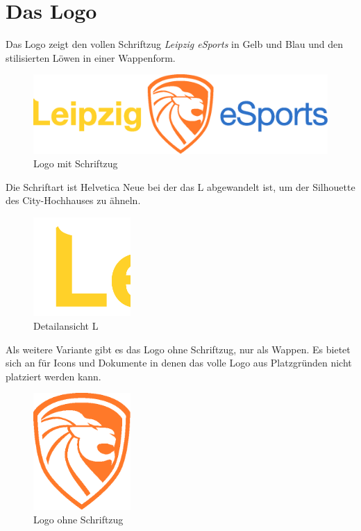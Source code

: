 \documentclass{article}
\begin{document}
\cleardoublepage
\section{Das Logo}

Das Logo zeigt den vollen Schriftzug \emph{Leipzig eSports} in Gelb und Blau und den stilisierten Löwen in einer Wappenform.
\begin{figure}[H]
\includegraphics[width=\textwidth]{Docs/Logo.eps}
\caption{Logo mit Schriftzug}
\end{figure}

Die Schriftart ist Helvetica Neue bei der das L abgewandelt ist, um der Silhouette des City-Hochhauses zu ähneln.

\begin{figure}[H]
\centering
\includegraphics[width=0.33\textwidth]{Docs/logo_detail_L.png}
\caption{Detailansicht L}
\end{figure}


Als weitere Variante gibt es das Logo ohne Schriftzug, nur als Wappen.
Es bietet sich an für Icons und Dokumente in denen das volle Logo aus Platzgründen nicht platziert werden kann.

\begin{figure}[H]
\centering
\includegraphics[width=0.33\textwidth]{Docs/Emblem.eps}
\caption{Logo ohne Schriftzug}
\end{figure}
\end{document}
